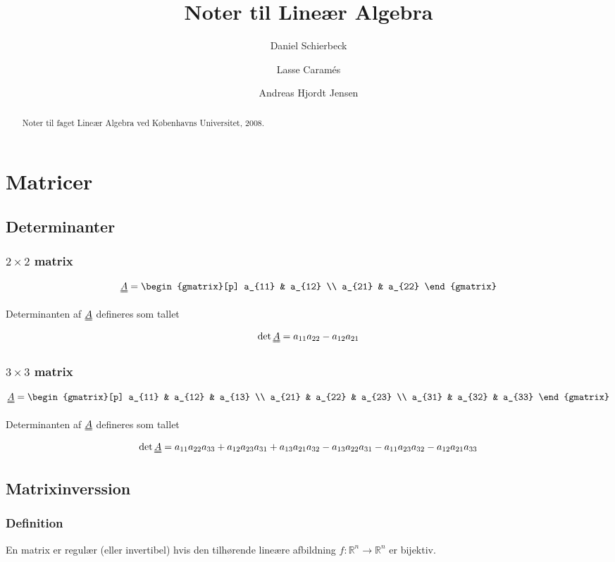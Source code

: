 \documentclass[a4paper]{article}
\title{Noter til Lineær Algebra}
\author{Daniel Schierbeck \and Lasse Caramés \and Andreas Hjordt Jensen}
\newcommand{\mtx}[1]{\uuline{#1}}
\begin{document}
\maketitle

\begin{abstract}
Noter til faget Lineær Algebra ved Københavns Universitet, 2008.
\end{abstract}

\tableofcontents

\section{Matricer}

\subsection{Determinanter}

\subsubsection{$2 \times 2$ matrix}
$$
\mtx{A} =
\begin{gmatrix}[p]
    a_{11} & a_{12} \\
    a_{21} & a_{22}
\end{gmatrix}
$$

Determinanten af $\mtx{A}$ defineres som tallet
$$
\det{\mtx{A}} = a_{11}a_{22} - a_{12}a_{21}
$$


\subsubsection{$3 \times 3$ matrix}
$$
\mtx{A} =
\begin{gmatrix}[p]
    a_{11} & a_{12} & a_{13} \\
    a_{21} & a_{22} & a_{23} \\
    a_{31} & a_{32} & a_{33}
\end{gmatrix}
$$

Determinanten af $\mtx{A}$ defineres som tallet
$$
\det{\mtx{A}} = a_{11}a_{22}a_{33} + a_{12}a_{23}a_{31} + a_{13}a_{21}a_{32} - a_{13}a_{22}a_{31} - a_{11}a_{23}a_{32} - a_{12}a_{21}a_{33}
$$


\subsection{Matrixinverssion}
\subsubsection{Definition}
En matrix er regulær (eller invertibel) hvis den tilhørende lineære afbildning $f:\mathbb{R}^{n}\rightarrow\mathbb{R}^{n}$ er bijektiv.
\end{document}
